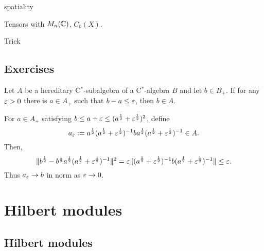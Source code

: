 \documentclass{../../large}
\begin{document}
\begin{prb}
spatiality
\end{prb}
\begin{prb}
\end{prb}

Tensors with $M_n(\mathbb{C})$, $C_0(X)$.


\begin{prb}
\end{prb}

Trick

\section*{Exercises}
\begin{prb}
Let $A$ be a hereditary C$^*$-subalgebra of a C$^*$-algebra $B$ and let $b\in B_+$.
If for any $\varepsilon>0$ there is $a\in A_+$ such that $b-a\le\varepsilon$, then $b\in A$.
\end{prb}
\begin{pf}
For $a\in A_+$ satisfying $b\le a+\varepsilon\le(a^{\frac12}+\varepsilon^{\frac12})^2$, define
\[a_\varepsilon:=a^{\frac12}(a^{\frac12}+\varepsilon^{\frac12})^{-1}ba^{\frac12}(a^{\frac12}+\varepsilon^{\frac12})^{-1}\in A.\]
Then, 
\[\|b^{\frac12}-b^{\frac12}a^{\frac12}(a^{\frac12}+\varepsilon^{\frac12})^{-1}\|^2=\varepsilon\|(a^{\frac12}+\varepsilon^{\frac12})^{-1}b(a^{\frac12}+\varepsilon^{\frac12})^{-1}\|\le\varepsilon.\]
Thus $a_\varepsilon\to b$ in norm as $\varepsilon\to0$.
\end{pf}









\chapter{Hilbert modules}

\section{Hilbert modules}
\end{document}
